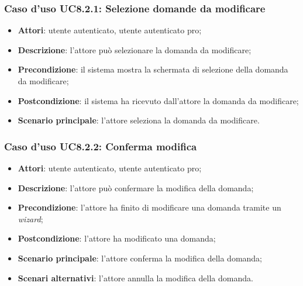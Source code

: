		\subsubsection{Caso d'uso UC8.2.1: Selezione domande da modificare}
		\begin{itemize}
			\item \textbf{Attori}: utente autenticato, utente autenticato pro;
			\item \textbf{Descrizione}: l'attore può selezionare la domanda da modificare;
			\item \textbf{Precondizione}: il sistema mostra la schermata di selezione della domanda da modificare;
			\item \textbf{Postcondizione}: il sistema ha ricevuto dall'attore la domanda da modificare; 
			\item \textbf{Scenario principale}: l'attore seleziona la domanda da modificare.
			
		\end{itemize}










	\subsubsection{Caso d'uso UC8.2.2: Conferma modifica}
	\begin{itemize}
		\item
			\textbf{Attori}: utente autenticato, utente autenticato pro;
		\item
			\textbf{Descrizione}: l'attore può confermare la modifica della domanda;
		\item		
			\textbf{Precondizione}: l'attore ha finito di modificare una domanda tramite un \textit{wizard};
		\item
			\textbf{Postcondizione}: l'attore ha modificato una domanda;
		\item
			\textbf{Scenario principale}: l'attore conferma la modifica della domanda;		
		\item
	 		\textbf{Scenari alternativi}: l'attore annulla la modifica della domanda.
	\end{itemize}		
